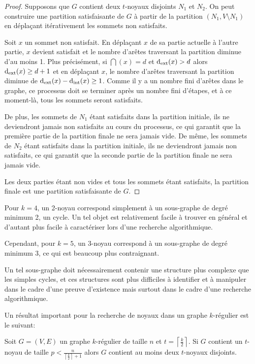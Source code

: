 \begin{proof}
    Supposons que \(G\) contient deux \(t\)-noyaux disjoints \(N_1\) et \(N_2\).
    On peut construire une partition satisfaisante de \(G\) à partir de la partition \((N_1, V \setminus N_1)\) en déplaçant itérativement les sommets non satisfaits.

    Soit \(x\) un sommet non satisfait. En déplaçant \(x\) de sa partie actuelle à l'autre partie, \(x\) devient satisfait et le nombre d'arêtes traversant la partition diminue d'au moins 1.
    Plus précisément, si \(\dint(x) = d\) et \(\operatorname{d_{\mathrm{ext}}}(x) > d\) alors \(\operatorname{d_{\mathrm{ext}}}(x) \geq d + 1\) et en déplaçant \(x\), le nombre d'arêtes traversant la partition diminue de \(\operatorname{d_{\mathrm{ext}}}(x) - \operatorname{d_{\mathrm{int}}}(x) \geq 1\).
    Comme il y a un nombre fini d'arêtes dans le graphe, ce processus doit se terminer après un nombre fini d'étapes, et à ce moment-là, tous les sommets seront satisfaits.

    De plus, les sommets de \(N_1\) étant satisfaits dans la partition initiale, ils ne deviendront jamais non satisfaits au cours du processus, ce qui garantit que la première partie de la partition finale ne sera jamais vide.
    De même, les sommets de \(N_2\) étant satisfaits dans la partition initiale, ils ne deviendront jamais non satisfaits, ce qui garantit que la seconde partie de la partition finale ne sera jamais vide.

    Les deux parties étant non vides et tous les sommets étant satisfaits, la partition finale est une partition satisfaisante de \(G\).
\end{proof}

Pour \(k = 4\), un 2-noyau correspond simplement à un sous-graphe de degré minimum 2, un cycle.
Un tel objet est relativement facile à trouver en général et d'autant plus facile à caractériser lors d'une recherche algorithmique.

Cependant, pour \(k = 5\), un 3-noyau correspond à un sous-graphe de degré minimum 3, ce qui est beaucoup plus contraignant.

Un tel sous-graphe doit nécessairement contenir une structure plus complexe que les simples cycles, et ces structures sont plus difficiles à identifier et à manipuler dans le cadre d'une preuve d'existence mais surtout dans le cadre d'une recherche algorithmique.

Un résultat important pour la recherche de noyaux dans un graphe \(k\)-régulier est le suivant:
\begin{proposition}\label{prop:kernel_size}
    Soit \(G = (V, E)\) un graphe \(k\)-régulier de taille \(n\) et \(t = \left\lceil \frac{k}{2} \right\rceil\).
    Si \(G\) contient un \(t\)-noyau de taille \(p < \frac{n}{\left\lceil \frac{k}{2} \right\rceil + 1}\) alors \(G\) contient au moins deux \(t\)-noyaux disjoints.
\end{proposition}

